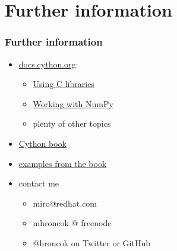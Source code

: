 \documentclass{beamer}
\begin{document}
\section{Further information}

\begin{frame}
  \frametitle{Further information}
    \begin{itemize}
      \item \href{http://docs.cython.org/}{docs.cython.org}:
      \begin{itemize}
        \item \href{http://docs.cython.org/src/tutorial/clibraries.html}{Using C libraries}
        \item \href{http://docs.cython.org/src/tutorial/numpy.html}{Working with NumPy}
        \item plenty of other topics
      \end{itemize}
      \item \href{http://shop.oreilly.com/product/0636920033431.do}{Cython book}
      \item \href{https://github.com/cythonbook/examples}{examples from the book}
      \item contact me
      \begin{itemize}
        \item miro@redhat.com
        \item mhroncok @ freenode
        \item @hroncok on Twitter or GitHub
      \end{itemize}
    \end{itemize}
\end{frame}
\end{document}
